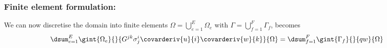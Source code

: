 







\subsubsection{Finite element formulation:}

We can now discretise the domain into finite elements \ie $\Omega=
\displaystyle{\bigcup_{e=1}^{E}}\Omega_{e}$ with
$\Gamma=\displaystyle{\bigcup_{f=1}^{F}}\Gamma_{f}$, 
 becomes
\begin{equation}
  \dsum_{e=1}^{E}\gint{\Omega_{e}}{}{G^{jk}\sigma^{i}_{j}\covarderiv{u}{i}\covarderiv{w}{k}}{\Omega}
  =\dsum_{f=1}^{F}\gint{\Gamma_{f}}{}{qw}{\Omega}
\end{equation}

